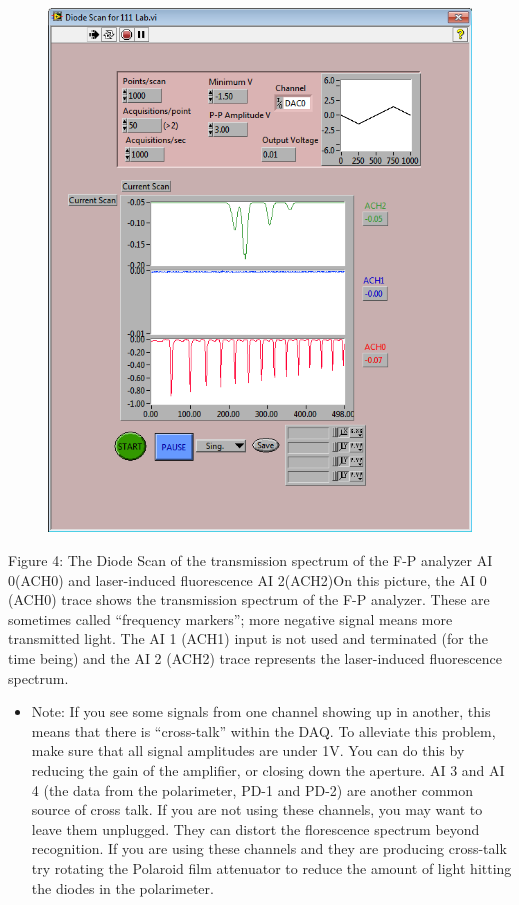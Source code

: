 \documentclass{../lab}
\begin{document}
\begin{figure}[h]
    \centering
    \href{http://experimentationlab.berkeley.edu/sites/default/files/images/Rb_doppler_spect.png}{\includegraphics[width=0.5\linewidth]{images/Rb_doppler_spect.png}}
    \caption{}
    \label{fig:Rb_doppler_spect}
\end{figure}


Figure 4: The Diode Scan of the transmission spectrum of the F-P analyzer AI 0(ACH0) and laser-induced fluorescence AI 2(ACH2)On this picture, the AI 0 (ACH0) trace shows the transmission spectrum of the F-P analyzer. These are sometimes called ``frequency markers''; more negative signal means more transmitted light. The AI 1 (ACH1) input is not used and terminated (for the time being) and the AI 2 (ACH2) trace represents the laser-induced fluorescence spectrum.

\begin{itemize}
    \item Note: If you see some signals from one channel showing up in another, this means that there is ``cross-talk'' within the DAQ. To alleviate this problem, make sure that all signal amplitudes are under 1V. You can do this by reducing the gain of the amplifier, or closing down the aperture. AI 3 and AI 4 (the data from the polarimeter, PD-1 and PD-2) are another common source of cross talk. If you are not using these channels, you may want to leave them unplugged. They can distort the florescence spectrum beyond recognition. If you are using these channels and they are producing cross-talk try rotating the Polaroid film attenuator to reduce the amount of light hitting the diodes in the polarimeter.

\end{itemize}
\end{document}

